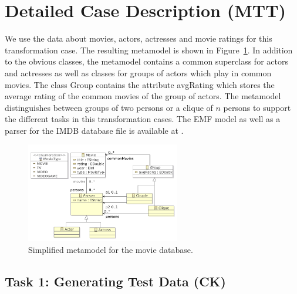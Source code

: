 \documentclass[a4paper,11pt]{article}
\newcommand{\p}[1]{\textsf{\small #1}}
\begin{document}
\section{Detailed Case Description (MTT)}\label{sec-case}

We use the data about movies, actors, actresses and movie ratings for
this transformation case. The resulting metamodel is shown in
Figure~\ref{fig:metamodel}. In addition to the obvious classes, the
metamodel contains a common superclass for actors and actresses as
well as classes for groups of actors which play in common movies. The
class \p{Group} contains the attribute \p{avgRating} which stores the
average rating of the common movies of the group of actors. The
metamodel distinguishes between groups of two persons or a clique of
$n$ persons to support the different tasks in this transformation
cases.  The EMF model as well as a parser for the IMDB database file
is available at \cite{IMDB2EMF}.

\begin{figure}[ht]
\centering
\includegraphics[width=0.6\textwidth]{movies}
\caption{Simplified metamodel for the movie database.}
\label{fig:metamodel}
\end{figure}

\subsection{Task 1: Generating Test Data (CK)}
\label{sec:gen-test-data}

\end{document}
